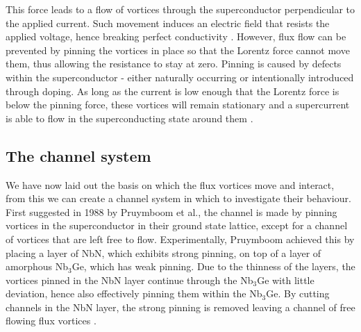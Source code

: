 \documentclass{article}
\numberwithin{equation}{section}
\begin{document}
This force leads to a flow of vortices through the superconductor perpendicular to the applied current. Such movement induces an electric field that resists the applied voltage, hence breaking perfect conductivity \cite{Tinkham2004IntroductionSuperconductivity}. However, flux flow can be prevented by pinning the vortices in place so that the Lorentz force cannot move them, thus allowing the resistance to stay at zero. Pinning is caused by defects within the superconductor - either naturally occurring or intentionally introduced through doping. As long as the current is low enough that the Lorentz force is below the pinning force, these vortices will remain stationary and a supercurrent is able to flow in the superconducting state around them \cite{Poole2014Superconductivity}.

\subsection{The channel system}
We have now laid out the basis on which the flux vortices move and interact, from this we can create a channel system in which to investigate their behaviour.
First suggested in 1988 by Pruymboom et al., the channel is made by pinning vortices in the superconductor in their ground state lattice, except for a channel of vortices that are left free to flow. Experimentally, Pruymboom achieved this by placing a layer of NbN, which exhibits strong pinning, on top of a layer of amorphous Nb$_3$Ge, which has weak pinning. Due to the thinness of the layers, the vortices pinned in the NbN layer continue through the Nb$_3$Ge with little deviation, hence also effectively pinning them within the Nb$_3$Ge. By cutting channels in the NbN layer, the strong pinning is removed leaving a channel of free flowing flux vortices \cite{Pruymboom1988Flux-lineFilms}.
\end{document}
